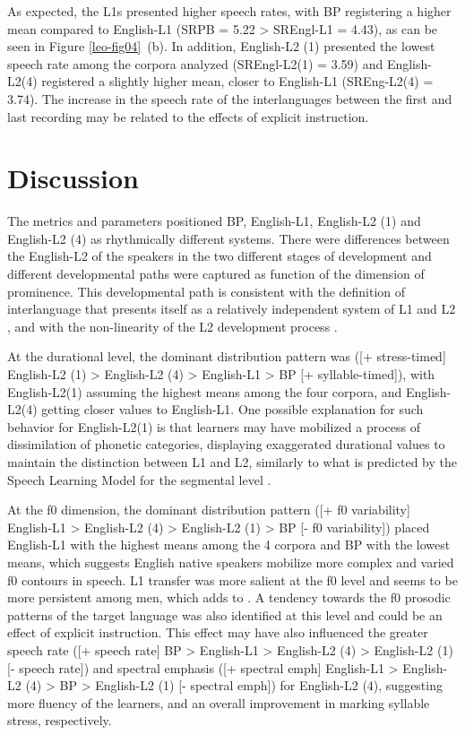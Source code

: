 As expected, the L1s presented higher speech rates, with BP registering a
higher mean compared to English-L1 (SRPB = 5.22 > SREngl-L1 = 4.43), as can be seen in Figure \ref{leo-fig04}~(b). In
addition, English-L2 (1) presented the lowest speech rate among the corpora
analyzed (SREngl-L2(1) = 3.59) and English-L2(4) registered a slightly higher
mean, closer to English-L1 (SREng-L2(4) = 3.74). The increase in the speech
rate of the interlanguages between the first and last recording may be related
to the effects of explicit instruction.

\section{Discussion}
The metrics and parameters positioned BP, English-L1, English-L2 (1) and
English-L2 (4) as rhythmically different systems. There were differences
between the English-L2 of the speakers in the two different stages of
development and different developmental paths were captured as function of the
dimension of prominence.  This developmental path is consistent with the
definition of interlanguage that presents itself as a relatively independent
system of L1 and L2 \citep{li2014}, and with the non-linearity of the L2
development process \citep{lima2019}.

At the durational level, the dominant distribution pattern was ([+ stress-timed]
English-L2 (1) > English-L2 (4) > English-L1 > BP [+ syllable-timed]), with
English-L2(1) assuming the highest means among the four corpora, and
English-L2(4) getting closer values to English-L1. One possible explanation for
such behavior for English-L2(1) is that learners may have mobilized a process
of dissimilation of phonetic categories, displaying exaggerated durational
values to maintain the distinction between L1 and L2, similarly to what is
predicted by the Speech Learning Model for the segmental level \citep{flege1995,flege2021}. %

At the f0  dimension, the dominant distribution pattern ([+ f0 variability]
English-L1 > English-L2 (4) > English-L2 (1) > BP [- f0 variability]) placed
English-L1 with the highest means among the 4 corpora and BP with the lowest
means, which suggests English native speakers mobilize more complex and varied
f0 contours in speech. L1 transfer was more salient at the f0 level and seems
to be more persistent among men, which adds to \citet{urbani2012}. A tendency
towards the f0 prosodic patterns of the target language was also identified at
this level and could be an effect of explicit instruction. This effect may have
also influenced the greater speech rate ([+ speech rate] BP > English-L1 >
English-L2 (4) > English-L2 (1) [- speech rate]) and spectral emphasis ([+
spectral emph] English-L1 > English-L2 (4) > BP > English-L2 (1) [- spectral
emph]) for English-L2 (4), suggesting more fluency of the learners, and an
overall improvement in marking syllable stress, respectively.

